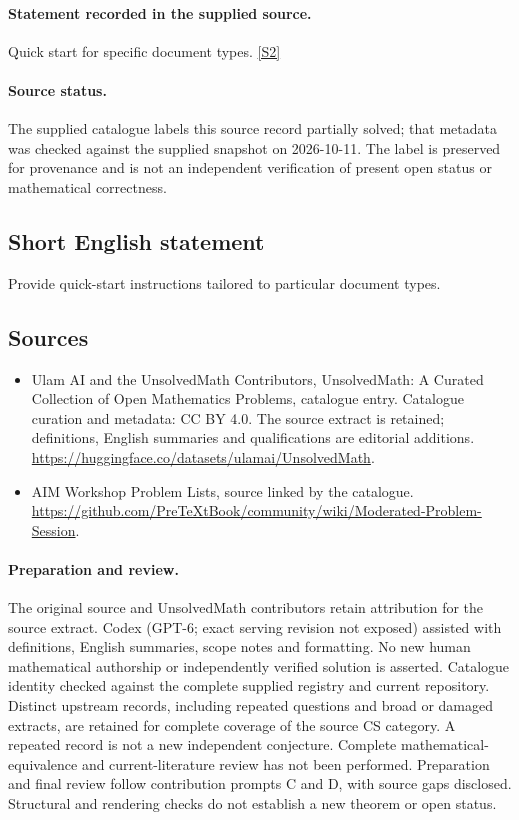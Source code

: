 \documentclass[11pt]{article}
\begin{document}
\paragraph{Statement recorded in the supplied source.}
Quick start for specific document types. \href{https://github.com/PreTeXtBook/community/wiki/Moderated-Problem-Session}{[S2]}
\paragraph{Source status.}
The supplied catalogue labels this source record partially solved; that metadata was checked against the supplied snapshot on 2026-10-11. The label is preserved for provenance and is not an independent verification of present open status or mathematical correctness.
\subsection{Short English statement}
Provide quick-start instructions tailored to particular document types.
\subsection{Sources}
\begin{itemize}
\item[S1] Ulam AI and the UnsolvedMath Contributors, UnsolvedMath: A Curated Collection of Open Mathematics Problems, catalogue entry. Catalogue curation and metadata: CC BY 4.0. The source extract is retained; definitions, English summaries and qualifications are editorial additions.
\url{https://huggingface.co/datasets/ulamai/UnsolvedMath}.
\item[S2] AIM Workshop Problem Lists, source linked by the catalogue.
\url{https://github.com/PreTeXtBook/community/wiki/Moderated-Problem-Session}.
\end{itemize}
\paragraph{Preparation and review.}
The original source and UnsolvedMath contributors retain attribution for the source extract. Codex (GPT-6; exact serving revision not exposed) assisted with definitions, English summaries, scope notes and formatting. No new human mathematical authorship or independently verified solution is asserted. Catalogue identity checked against the complete supplied registry and current repository. Distinct upstream records, including repeated questions and broad or damaged extracts, are retained for complete coverage of the source CS category. A repeated record is not a new independent conjecture. Complete mathematical-equivalence and current-literature review has not been performed. Preparation and final review follow contribution prompts C and D, with source gaps disclosed. Structural and rendering checks do not establish a new theorem or open status.
\label{end:statement}
\end{document}
